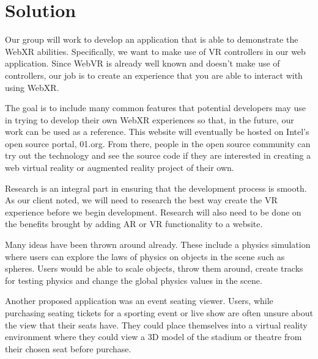 \section{Solution}
\label{sec:Solution}
Our group will work to develop an application that is able to demonstrate the WebXR abilities. Specifically, we want to make use of VR controllers in our web application. Since WebVR is already well known and doesn’t make use of controllers, our job is to create an experience that you are able to interact with using WebXR.

The goal is to include many common features that potential developers may use in trying to develop their own WebXR experiences so that, in the future, our work can be used as a reference. This website will eventually be hosted on Intel’s open source portal, 01.org. From there, people in the open source community can try out the technology and see the source code if they are interested in creating a web virtual reality or augmented reality project of their own. 

Research is an integral part in ensuring that the development process is smooth. As our client noted, we will need to research the best way create the VR experience before we begin development. Research will also need to be done on the benefits brought by adding AR or VR functionality to a website.

Many ideas have been thrown around already. These include a physics simulation where users can explore the laws of physics on objects in the scene such as spheres. Users would be able to scale objects, throw them around, create tracks for testing physics and change the global physics values in the scene.

Another proposed application was an event seating viewer. Users, while purchasing seating tickets for a sporting event or live show are often unsure about the view that their seats have. They could place themselves into a virtual reality environment where they could view a 3D model of the stadium or theatre from their chosen seat before purchase.

